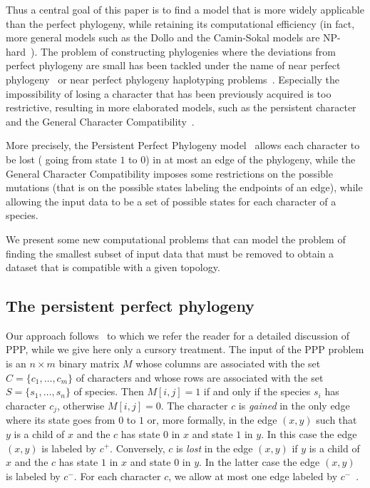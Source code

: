 Thus a central goal of this paper  is to find a model that is more
widely applicable than the perfect phylogeny, while retaining  its computational
efficiency (in fact, more general models such as the Dollo and the Camin-Sokal
models are NP-hard~\cite{felsenstein:inferring-phylogenies}).
The problem of constructing  phylogenies where the deviations from perfect phylogeny are  small
has been tackled under the name of near perfect
phylogeny~\cite{DBLP:journals/siamcomp/Fernandez-BacaL03} or near perfect
phylogeny  haplotyping  problems~\cite{DBLP:conf/ismb/SatyaMAPB06}.
Especially the impossibility of losing a character that has been previously
acquired is too restrictive, resulting in more elaborated models,
such as the persistent character~\cite{Pr1} and the General Character
Compatibility~\cite{DBLP:conf/isbra/ManuchPG11,mavnuch2009generalised}.

More precisely, the  Persistent Perfect Phylogeny
model~\cite{DBLP:journals/tcs/BonizzoniBDT12} allows each character to be lost
(\ie{} going from state $1$ to $0$) in at most an edge of the phylogeny, while the
General Character Compatibility imposes some restrictions on the possible
mutations (that is on the possible states labeling the endpoints of an edge),
while allowing the input data to be a set of possible states for each character
of a species.

We present some new computational problems that can model the problem
of finding the smallest subset of input data that must be removed to
obtain a dataset that is compatible with a given topology.




\subsection*{The persistent perfect phylogeny}

Our approach follows~\cite{DBLP:journals/tcs/BonizzoniBDT12} to which we refer
the reader for a detailed discussion of PPP, while we give here
only a cursory treatment.
The input of the PPP problem is an  $n \times m$ binary matrix $M$ whose
columns are associated with the set $C  = \{c_1, \ldots,
c_m\}$ of characters and whose rows are associated with the set $S = \{s_1, \dots,
s_n\}$ of species.
Then $M[i,j] = 1$ if and
only if the species $s_i$ has character $c_j$, otherwise $M[i,j] = 0$.
The character $c$ is \emph{gained} in the only edge where its state goes from $0$ to
$1$ or, more formally, in the edge $(x,y)$ such that $y$ is a child of $x$ and
the $c$ has state $0$ in $x$ and state $1$ in $y$.
In this case the edge $(x,y)$ is labeled by $c^{+}$.
Conversely, $c$ is \emph{lost} in the edge $(x,y)$ if $y$ is a child of $x$ and
the $c$ has state $1$ in $x$ and state $0$ in $y$.
In the latter case the edge $(x,y)$ is labeled by $c^{-}$.
For each character $c$, we allow at most one edge labeled by $c^{-}$~\cite{zeng,DBLP:journals/tcs/BonizzoniBDT12}.

